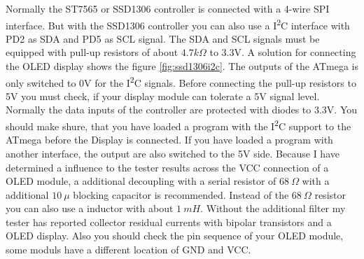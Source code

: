 Normally the ST7565 or SSD1306 controller is connected with a 4-wire SPI interface.
But with the SSD1306 controller you can also use a I\textsuperscript{2}C interface with PD2 as SDA and PD5 as SCL signal.
The SDA and SCL signals must be equipped with pull-up resistors of about \(4.7k\Omega\) to 3.3V.
A solution for connecting the OLED display shows the figure  \ref{fig:ssd1306i2c}.
The outputs of the ATmega is only switched to 0V for the I\textsuperscript{2}C signals.
Before connecting the pull-up resistors to 5V you must check, if your display module can tolerate
a 5V signal level. Normally the data inputs of the controller are protected with diodes to 3.3V.
You should make shure, that you have loaded a program with the I\textsuperscript{2}C support to the ATmega 
before the Display is connected. If you have loaded a program with another interface, 
the output are also switched to the 5V side.
Because I have determined a influence to the tester results across the VCC connection of a OLED module,
a additional decoupling with a serial resistor of \(68~\Omega\) with a additional \(10~\mu\) blocking capacitor
is recommended. Instead of the \(68~\Omega\) resistor you can also use a inductor with about \(1~mH\).
Without the additional filter my tester has reported collector residual currents with bipolar transistors and a
OLED display.
Also you should check the pin sequence of your OLED module, some moduls have a different location of GND and VCC.
 
